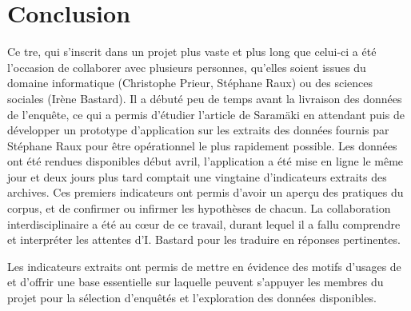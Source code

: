 
\section{Conclusion}

Ce {\sc tre}, qui s’inscrit dans un projet plus vaste et plus long que
celui-ci a été l’occasion de collaborer avec plusieurs personnes, qu’elles
soient issues du domaine informatique (Christophe Prieur, Stéphane Raux) ou
des sciences sociales (Irène Bastard). Il a débuté peu de temps avant la
livraison des données de l’enquête, ce qui a permis d’étudier l’article de
Saram\"aki en attendant puis de développer un prototype d’application sur les
extraits des données fournis par Stéphane Raux pour être opérationnel le plus
rapidement possible. Les données ont été rendues disponibles début avril,
l’application a été mise en ligne le même jour et deux jours plus tard comptait
une vingtaine d’indicateurs extraits des archives. Ces premiers indicateurs ont
permis d’avoir un aperçu des pratiques du corpus, et de confirmer ou infirmer
les hypothèses de chacun. La collaboration interdisciplinaire a été au cœur de
ce travail, durant lequel il a fallu comprendre et interpréter les attentes
 d’I. Bastard pour les traduire en réponses 
pertinentes.

Les indicateurs extraits ont permis de mettre en évidence des motifs d’usages
de \fb{} et d’offrir une base essentielle sur laquelle peuvent s’appuyer les
membres du projet  pour la sélection d’enquêtés et l’exploration
des données disponibles.
